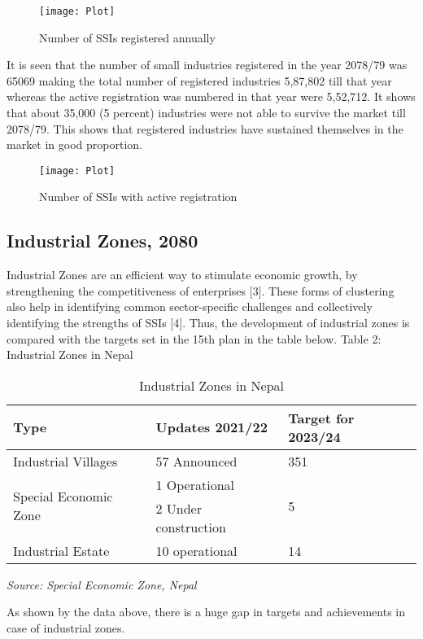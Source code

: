 \documentclass[a4paper]{article}
\begin{document}
\begin{figure}
\centering
\texttt{[image: Plot]}
\caption{Number of SSIs registered annually}
\end{figure} 

It is seen that the number of small industries registered in the year 2078/79 was 65069 making the total number of registered industries 5,87,802 till that year whereas the active registration was numbered in that year were 5,52,712. It shows that about 35,000 (5 percent) industries were not able to survive the market till 2078/79. This shows that registered industries have sustained themselves in the market in good proportion. 

\begin{figure}
\centering
\texttt{[image: Plot]}
\caption{Number of SSIs with active registration}
\end{figure}
  

\subsection{Industrial Zones, 2080}
Industrial Zones are an efficient way to stimulate economic growth, by strengthening the competitiveness of enterprises [3]. These forms of clustering also help in identifying common sector-specific challenges and collectively identifying the strengths of SSIs [4]. Thus, the development of industrial zones is compared with the targets set in the 15th plan in the table below.
Table 2: Industrial Zones in Nepal
\begin{table}[!h]
\centering
\begin{tabular}{lll}\hline
Type & Updates 2021/22 & Target for 2023/24\\\hline
Industrial Villages & 57 Announced & 351\\\hline
\multirow{2}{*}{Special Economic Zone} & 1 Operational & \multirow{2}{*}{5} \\
& 2 Under construction &\\\hline
Industrial Estate & 10 operational & 14 \\\hline
\end{tabular}
\caption{Industrial Zones in Nepal}
\textit{ Source: Special Economic Zone, Nepal}
\end{table}


As shown by the data above, there is a huge gap in targets and achievements in case of industrial zones.
 
\end{document}

